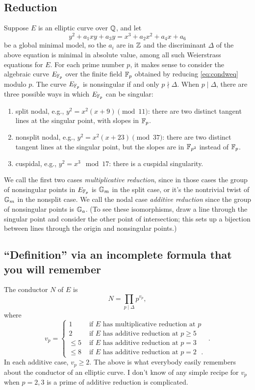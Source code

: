 \documentclass{book}
\begin{document}
\subsection{Reduction}
Suppose $E$ is an elliptic curve over $\mathbb{Q}$, and let
\begin{equation}\label{eq:condweq}
y^2 + a_1 xy + a_3 y = x^3 + a_2 x^2 + a_4 x + a_6
\end{equation}
be a global minimal model, so the $a_i$ are in $\mathbb{Z}$
and the discriminant $\Delta$ of the above equation is minimal
in absolute value, among all such Weierstrass equations for $E$.
For each prime number $p$, it makes sense to consider
the algebraic curve $E_{\mathbb{F}_p}$ over the finite field
$\mathbb{F}_p$ obtained by reducing \eqref{eq:condweq} modulo $p$.
The curve $E_{\mathbb{F}_p}$ is nonsingular if and only $p\nmid \Delta$.
When $p\mid \Delta$, there are three possible ways in which
$E_{\mathbb{F}_p}$ can be singular:
\begin{enumerate}
\item split nodal, e.g., $y^2=x^2(x+9)\pmod{11}$: there are two distinct
tangent lines at the singular point, with slopes in $\mathbb{F}_p$.
\item nonsplit nodal, e.g., $y^2=x^2(x+23) \pmod{37}$: there are two distinct tangent lines
at the singular point, but the slopes are in $\mathbb{F}_{p^2}$ instead
of $\mathbb{F}_p$.
\item cuspidal, e.g., $y^2=x^3\mod{17}$: there is a cuspidal singularity.
\end{enumerate}
We call the first two cases {\em multiplicative reduction}, since in those
cases the group of nonsingular points in $E_{\mathbb{F}_p}$ is $\mathbb{G}_m$ in
the split case, or it's the nontrivial twist of $\mathbb{G}_m$ in the nonsplit case.
We call the nodal case {\em additive reduction} since the group of nonsingular points is $\mathbb{G}_a$.  (To see these isomorphisms, draw a line through the singular point and consider the other point of intersection; this sets up a bijection between lines through the origin and nonsingular points.)

\subsection{``Definition'' via an incomplete formula that you will remember}
The conductor $N$ of $E$ is
$$
N = \prod_{p\mid\Delta} p^{v_p},
$$
where
$$
v_p = \begin{cases}
 1 & \text{ if $E$ has multiplicative reduction at $p$ } \\
 2 & \text{ if $E$ has additive reduction at $p\geq 5$ } \\
 \leq 5 & \text{ if $E$ has additive reduction at $p=3$ }\\
 \leq 8 & \text{ if $E$ has additive reduction at $p=2$ }.
 \end{cases}.
$$
In each additive case, $v_p\geq 2$.
The above is what everybody easily remembers about the conductor
of an elliptic curve.  I don't know of any simple
recipe for $v_p$ when $p=2,3$ is
a prime of additive reduction is complicated.
\end{document}
